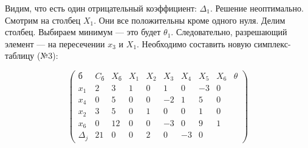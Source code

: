 \documentclass{article}
\begin{document}
Видим, что есть один отрицательный коэффициент: $\Delta_{1}$. Решение неоптимально. Смотрим на столбец $X_{1}$. Они все положительны кроме одного нуля. Делим столбец. Выбираем минимум — это будет $\theta_{1}$. Следовательно, разрешающий элемент — на пересечении $x_3$ и $X_1$. Необходимо составить новую симплекс-таблицу (№3):

$$
\begin{pmatrix}
    \text{б} & C_{\text{б}} & X_{\text{б}} & X_1 & X_2 & X_3 & X_4 & X_5 & X_6 & \theta \\
    x_1 & 2 & 3 & 1 & 0 & 1 & 0 & -3 & 0 \\
    x_4 & 0 & 5 & 0 & 0 & -2 & 1 & 5 & 0 \\ 
    x_2 & 3 & 5 & 0 & 1 & 0 & 0 & 1 & 0 \\
    x_6 & 0 & 12 & 0 & 0 & -3 & 0 & 9 & 1 \\
    \Delta_{j} & 21 & 0 & 0 & 2 & 0 & -3 & 0
\end{pmatrix}
$$
\end{document}
